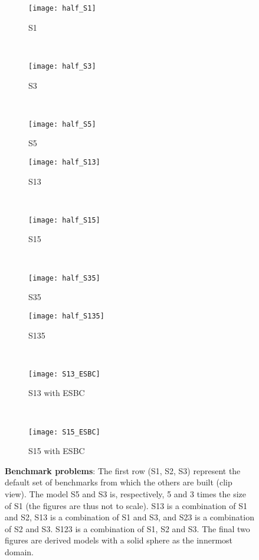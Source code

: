 \begin{figure}
	\centering
	\begin{subfigure}{0.3\textwidth}
		\centering
		\texttt{[image: half\_S1]}
		\caption{S1}
    \end{subfigure}
	~
	\begin{subfigure}{0.3\textwidth}
		\centering
		\texttt{[image: half\_S3]}
		\caption{S3}
    \end{subfigure}
	~
	\begin{subfigure}{0.3\textwidth}
		\centering
		\texttt{[image: half\_S5]}
		\caption{S5}
    \end{subfigure}
	\par\bigskip
	\begin{subfigure}{0.3\textwidth}
		\centering
		\texttt{[image: half\_S13]}
		\caption{S13}
    \end{subfigure}
	~
	\begin{subfigure}{0.3\textwidth}
		\centering
		\texttt{[image: half\_S15]}
		\caption{S15}
    \end{subfigure}
	~
	\begin{subfigure}{0.3\textwidth}
		\centering
		\texttt{[image: half\_S35]}
		\caption{S35}
    \end{subfigure}
	\par\bigskip
	\begin{subfigure}{0.3\textwidth}
		\centering
		\texttt{[image: half\_S135]}
		\caption{S135}
    \end{subfigure}
	~
	\begin{subfigure}{0.3\textwidth}
		\centering
		\texttt{[image: S13\_ESBC]}
		\caption{S13 with ESBC}
		\label{Fig1:S12_ASI_3NN}
    \end{subfigure}
	~
	\begin{subfigure}{0.3\textwidth}
		\centering
		\texttt{[image: S15\_ESBC]}
		\caption{S15 with ESBC}
		\label{Fig1:S23_ASI_3NN}
    \end{subfigure}
    \caption{\textbf{Benchmark problems}: The first row (S1, S2, S3) represent the default set of benchmarks from which the others are built (clip view). The model S5 and S3 is, respectively, 5 and 3 times the size of S1 (the figures are thus not to scale). S13 is a combination of S1 and S2, S13 is a combination of S1 and S3, and S23 is a combination of S2 and S3. S123 is a combination of S1, S2 and S3. The final two figures are derived models with a solid sphere as the innermost domain.}
	\label{Fig1:BenchmarksProblems}
\end{figure}

